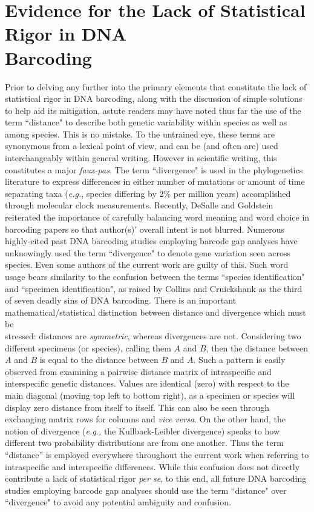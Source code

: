 \section{Evidence for the Lack of Statistical Rigor in DNA \\ Barcoding}

Prior to delving any further into the primary elements that constitute the lack of \\ statistical rigor in DNA barcoding, along with the discussion of simple solutions to help aid its mitigation, astute readers may have noted thus far the use of the term ``distance" to describe both genetic variability within species as well as among species. This is no mistake. To the untrained eye, these terms are synonymous from a lexical point of view, and can be (and often are) used interchangeably within general writing. However in scientific writing, this constitutes a major \textit{faux-pas}. The term ``divergence" is used in the phylogenetics literature to express differences in either number of mutations or amount of time separating taxa (\textit{e.g.}, species differing by 2\% per million years) accomplished through molecular clock measurements. Recently, DeSalle and Goldstein \cite{desalle2019review} reiterated the importance of carefully balancing word meaning and word choice in barcoding papers so that author(s)' overall intent is not blurred. Numerous highly-cited past DNA barcoding studies employing barcode gap analyses have unknowingly used the term ``divergence" to denote gene variation seen across species. Even some authors of the current work are guilty of this. Such word usage bears similarity to the confusion between the terms ``species identification" and ``specimen identification", as raised by Collins and Cruickshank \cite{collins2013seven} as the third of seven deadly sins of DNA barcoding. There is an important \\ mathematical/statistical distinction between distance and divergence which must be \\ stressed: distances are \textit{symmetric}, whereas divergences are not. Considering two different specimens (or species), calling them $A$ and $B$, then the distance between $A$ and $B$ is equal to the distance between $B$ and $A$. Such a pattern is easily observed from examining a pairwise distance matrix of intraspecific and interspecific genetic distances. Values are identical (zero) with respect to the main diagonal (moving top left to bottom right), as a specimen or species will display zero distance from itself to itself. This can also be seen through exchanging matrix rows for columns and \textit{vice versa}. On the other hand, the notion of divergence (\textit{e.g.,} the Kullback-Leibler divergence) speaks to how different two probability distributions are from one another. Thus the term ``distance'' is employed everywhere throughout the current work when referring to intraspecific and interspecific differences. While this confusion does not directly contribute a lack of statistical rigor \textit{per se}, to this end, all future DNA barcoding studies employing barcode gap analyses should use the term ``distance" over ``divergence" to avoid any potential ambiguity and confusion.  



